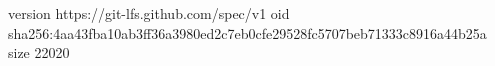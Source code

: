 version https://git-lfs.github.com/spec/v1
oid sha256:4aa43fba10ab3ff36a3980ed2c7eb0cfe29528fc5707beb71333c8916a44b25a
size 22020
